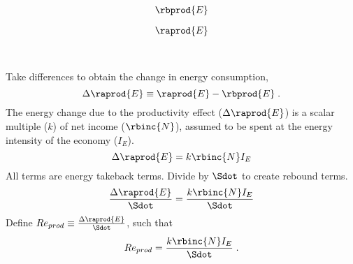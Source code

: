 

\begin{landscape}

\linespread{1}


\sectionsep{}

{
\begin{equation}
  \rbprod{E}
\end{equation}
}
{
}

\sectionsep{}

{
\begin{equation}
\raprod{E}
\end{equation}
}
{
}

\sectionsep{}

\derivsection{}
{
~

Take differences to obtain the change in energy consumption,
%
\begin{equation}
  \Delta \raprod{E} \equiv \raprod{E} - \rbprod{E} \; .
\end{equation}
%
The energy change due to the productivity effect ($\Delta \raprod{E}$) 
is a scalar multiple ($k$) of net income ($\rbinc{N}$), 
assumed to be spent at the energy intensity of the economy ($I_E$).
%
\begin{equation}
  \Delta \raprod{E} = k \rbinc{N} I_E
\end{equation}
%
All terms are energy takeback terms.
Divide by $\Sdot$
to create rebound terms.
%
\begin{equation}
  \frac{\Delta \raprod{E}}{\Sdot} = \frac{k \rbinc{N} I_E}{\Sdot}
\end{equation}
%
Define 
$Re_{prod} \equiv \frac{\Delta \raprod{E}}{\Sdot}$, 
such that
%
\begin{equation}
  Re_{prod} = \frac{k \rbinc{N} I_E}{\Sdot} \; .
\end{equation}
%
}
{
~

}
\end{landscape}